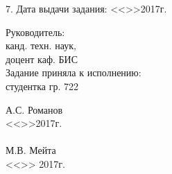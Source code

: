 7. Дата выдачи задания: 
<<\underline{\hspace{1cm}}>>\underline{\hspace{3cm}}2017г.

\begin{singlespace}
 \begin{minipage}[left]{0.40\linewidth}
 Руководитель: \\
  канд. техн. наук, \\доцент каф. БИС \\
  

 Задание приняла к исполнению:\\
 студентка гр. 722\\
 \end{minipage}
  \hfill
 \begin{minipage}[left]{0.45\linewidth}
  \vspace{0.7cm}
\underline{\hspace{3cm}} А.С. Романов \\
  <<\underline{\hspace{1cm}}>>\underline{\hspace{3cm}}2017г.\\
 \vspace{0.3cm}\\ 
  \underline{\hspace{3cm}}М.В. Мейта  \\
 <<\underline{\hspace{1cm}}>>\underline{\hspace{3cm}} 2017г.\\
 \end{minipage}
\end{singlespace}
